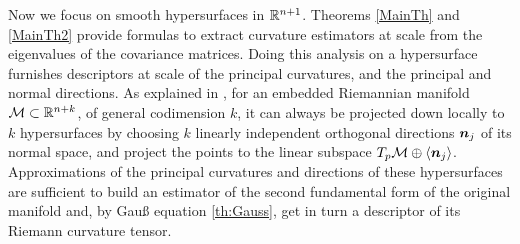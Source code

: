 \documentclass[letterpaper, reqno, 11pt]{amsart}
\theoremstyle{definition}
\theoremstyle{remark}
\numberwithin{equation}{section}
\begin{document}
Now we focus on smooth hypersurfaces in ${\mathbb R}^{n+1}$. Theorems \ref{MainTh} and \ref{MainTh2} provide formulas to extract curvature estimators at scale from the eigenvalues of the covariance matrices. Doing this analysis on a hypersurface furnishes descriptors at scale of the principal curvatures, and the principal and normal directions. As explained in \cite{alvarez2018a}, for an embedded Riemannian manifold ${\mathcal M}\subset{\mathbb R}^{n+k}$, of general codimension $k$, it can always be projected down locally to $k$ hypersurfaces by choosing $k$ linearly independent orthogonal directions $\boldsymbol{n}_j$ of its normal space, and project the points to the linear subspace $T_p{\mathcal M}\oplus\langle \boldsymbol{n}_j\rangle$. Approximations of the principal curvatures and directions of these hypersurfaces are sufficient to build an estimator of the second fundamental form of the original manifold and, by Gau{\ss} equation \ref{th:Gauss}, get in turn a descriptor of its Riemann curvature tensor.
\end{document}
